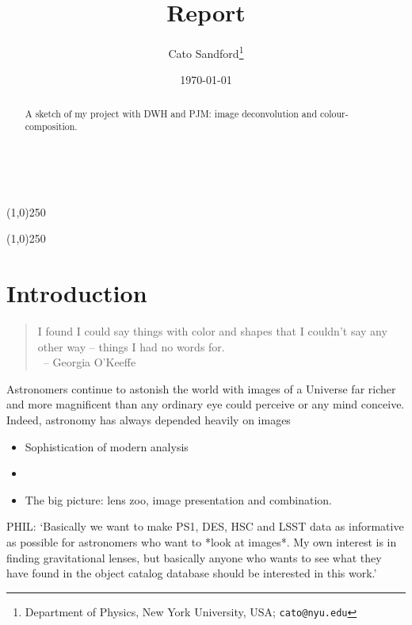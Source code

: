 \documentclass[letterpaper, 11pt]{article}
\title{Report\\}
\author{Cato Sandford\thanks{Department of Physics, New York University, USA; \texttt{cato@nyu.edu}}}
\date{\today}
\def\wspace{\textcolor{white}{Lorem ipsum}}
\def\MORE{{\color{red}{\bf MORE}}\xspace}
\begin{document}
\maketitle

\wspace\newline\wspace\newline


\begin{abstract}
A sketch of my project with DWH and PJM: image deconvolution and colour-composition.
\end{abstract}


\begin{center}
\line(1,0){250}
\end{center}
\vspace{-0.5cm}
\tableofcontents
\vspace{-0.1cm}
\begin{center}
\line(1,0){250}
\end{center}
\newpage


\section{Introduction}

\begin{quote}
	I found I could say things with color and shapes that I couldn't say any other way -- things I had no words for.\\	
	\mbox{}~\hfill -- Georgia O'Keeffe
\end{quote}

Astronomers continue to astonish the world with images of a Universe far richer and more magnificent than any ordinary eye could perceive or any mind conceive. Indeed, astronomy has always depended heavily on images\MORE

\begin{itemize}
	\item Sophistication of modern analysis
	\item 
	\item The big picture: lens zoo, image presentation and combination.
\end{itemize}


PHIL: `Basically we want to make PS1, DES, HSC and LSST data as informative
as possible for astronomers who want to *look at images*. My own
interest is in finding gravitational lenses, but basically anyone who
wants to see what they have found in the object catalog database
should be interested in this work.'
\end{document}
